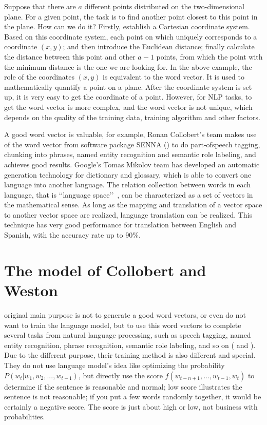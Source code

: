 Suppose that there are $a$ different points distributed on the two-dimensional plane. For a given point, the task is to find another point closest to this point in the plane. How can we do it? Firstly, establish a Cartesian coordinate system. Based on this coordinate system, each point on which uniquely corresponds to a coordinate $(x, y)$; and then introduce the Euclidean distance; finally calculate the distance between this point and other $a-1$ points, from which the point with the minimum distance is the one we are looking for. In the above example, the role of the coordinates $(x, y)$ is equivalent to the word vector. It is used to mathematically quantify a point on a plane. After the coordinate system is set up, it is very easy to get the coordinate of a point. However, for NLP tasks, to get the word vector is more complex, and the word vector is not unique, which depends on the quality of the training data, training algorithm and other factors.

A good word vector is valuable, for example, Ronan Collobert's team makes use of the word vector from software package SENNA (\citep{CollobertWestonEtAl2011}) to do part-ofspeech tagging, chunking into phrases, named entity recognition and semantic role labeling, and achieves good results. Google's Tomas Mikolov team has developed an automatic generation technology for dictionary and glossary, which is able to convert one language into another language. The relation collection between words in each language, that is \lq\lq language space\rq\rq\ , can be characterized as a set of vectors in the mathematical sense.  As long as the mapping and translation of a vector space to another vector space are realized, language translation can be realized. This technique has very good performance for translation between English and Spanish, with the accuracy rate up to $90\%$. 

\section{The model of Collobert and Weston}

\cite{CollobertWeston2008} original main purpose is not to generate a good word vectors, or even do not want to train the language model, but to use this word vectors to complete several tasks from natural language processing, such as speech tagging, named entity recognition, phrase recognition, semantic role labeling, and so on (\citep{CollobertWeston2008} and \citep{CollobertWestonEtAl2011}). Due to the different purpose, their training method is also different and special. They do not use language model's idea like optimizing the probability $P( w_t| w_1, w_2, ... , w_{t - 1})$, but directly use the score $f( w_{t - n + 1}, ... , w_{t - 1}, w_t)$  to determine if the sentence is reasonable and normal; low score illustrates the sentence is not reasonable; if you put a few words randomly together, it would be certainly a negative score. The score is just about high or low, not business with probabilities. 

